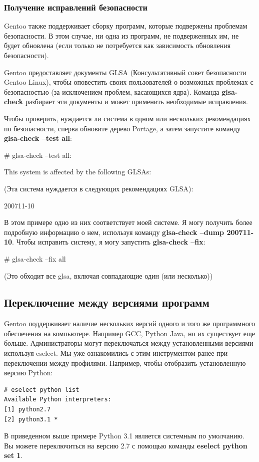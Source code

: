 \documentclass[10pt]{book}
\begin{document}
\subsubsection{Получение исправлений безопасности}

Gentoo также поддерживает сборку программ, которые подвержены проблемам безопасности. В этом случае, ни одна из программ, не подверженных им, не будет обновлена (если только не потребуется как зависимость обновления безопасности).

Gentoo предоставляет документы GLSA (Консультативный совет безопасности Gentoo Linux), чтобы оповестить своих пользователей о возможных проблемах с безопасностью (за исключением проблем, касающихся ядра). Команда \textbf{glsa-check} разбирает эти документы и может применить необходимые исправления.

Чтобы проверить, нуждается ли система в одном или нескольких рекомендациях по безопасности,  сперва обновите дерево Portage, а затем запустите команду \textbf{glsa-check --test all}:

\begin{tcolorbox}
\# glsa-check --test all:

This system is affected by the following GLSAs:

(Эта система нуждается в следующих рекомендациях GLSA):

200711-10
\end{tcolorbox}
В этом примере одно из них соответствует моей системе. Я могу получить более подробную информацию о нем, используя команду \textbf{glsa-check --dump 200711-10}. Чтобы исправить систему, я могу запустить  \textbf{glsa-check --fix}:

\begin{tcolorbox}
\# glsa-check --fix all 

(Это обходит все glsa, включая совпадающие один (или несколько))
\end{tcolorbox}

\subsection{Переключение между версиями программ}
Gentoo поддерживает наличие нескольких версий одного и того же программного обеспечения на компьютере. Например GCC, Python Java, но их существует еще больше. Администраторы могут переключаться между установленными версиями используя eselect. Мы уже ознакомились с этим инструментом ранее при переключении между профилями.
Например, чтобы отобразить установленную версию Python:
\begin{tcolorbox}
\begin{lstlisting}
# eselect python list
Available Python interpreters:
[1] python2.7
[2] python3.1 *
\end{lstlisting}
\end{tcolorbox}
В приведенном выше примере Python 3.1 является системным по умолчанию. Вы можете переключиться на версию 2.7 с помощью команды \textbf{eselect python set 1}.
\end{document}
